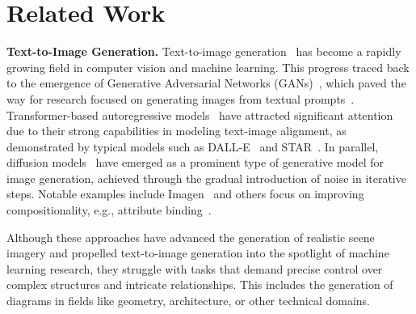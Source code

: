 \section{Related Work}

\noindent 
\textbf{Text-to-Image Generation.}
Text-to-image generation~\cite{zhang2023text, bie2024renaissance, jia2024human} has become a rapidly growing field in computer vision and machine learning.
This progress traced back to the emergence of Generative Adversarial Networks (GANs)~\cite{goodfellow2020generative}, which paved the way for research focused on generating images from textual prompts~\cite{reed2016generative, tao2022df, xu2018attngan,zhang2021cross,zhang2017stackgan,zhang2018stackgan++}.
Transformer-based autoregressive models~\cite{ding2021cogview, gafni2022make, ramesh2021zero, yu2022scaling} have attracted significant attention due to their strong capabilities in modeling text-image alignment, as demonstrated by typical models such as DALL-E~\cite{ramesh2021zero} and STAR~\cite{ma2024star}. 
In parallel, diffusion models~\cite{gu2022vector, nichol2021glide,ramesh2022hierarchical, rombach2022high,saharia2022photorealistic} have emerged as a prominent type of generative model for image generation, achieved through the gradual introduction of noise in iterative steps. Notable examples include Imagen~\cite{saharia2022photorealistic}
and others focus on improving compositionality,
e.g., attribute binding~\cite{chefer2023attend,feng2022training}. 

Although these approaches have advanced the generation of realistic scene imagery and propelled text-to-image generation into the spotlight of machine learning research, they struggle with tasks that demand precise control over complex structures and intricate relationships. This includes the generation of diagrams in fields like geometry, architecture, or other technical domains.

